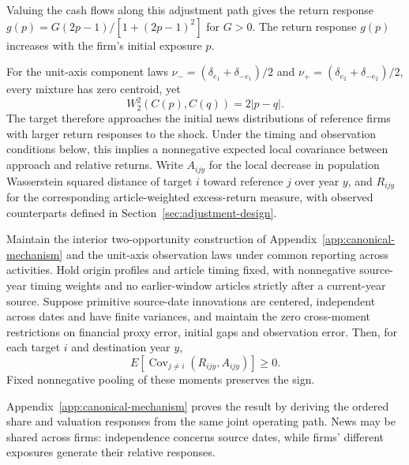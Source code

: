 Valuing the cash flows along this adjustment path gives the return response
$g(p)=G(2p-1)/[1+(2p-1)^2]$ for $G>0$.
The return response $g(p)$ increases with the firm's initial exposure $p$.

For the unit-axis component laws
$\nu_-=(\delta_{e_1}+\delta_{-e_1})/2$ and
$\nu_+=(\delta_{e_2}+\delta_{-e_2})/2$, every mixture has zero centroid, yet
\begin{equation}\label{eq:axis-observation}
  W_2^2(C(p),C(q))=2|p-q|.
\end{equation}
The target therefore approaches the initial news distributions of reference
firms with larger return responses to the shock.
Under the timing and observation conditions below, this implies a nonnegative
expected local covariance between approach and relative returns.
Write $A_{ijy}$ for the local decrease in population Wasserstein squared
distance of target $i$ toward
reference $j$ over year $y$, and $R_{ijy}$ for the corresponding article-weighted
excess-return measure, with observed counterparts defined in
Section~\ref{sec:adjustment-design}.

\begin{proposition}\label{prop:directional-alignment}
  Maintain the interior two-opportunity construction of
  Appendix~\ref{app:canonical-mechanism} and the unit-axis observation laws
  under common reporting across activities.
  Hold origin profiles and article timing fixed, with nonnegative source-year
  timing weights and no earlier-window articles strictly after a current-year
  source.
  Suppose primitive source-date innovations are centered, independent across
  dates and have finite variances, and maintain the zero cross-moment
  restrictions on financial proxy error, initial gaps and observation error.
  Then, for each target $i$ and destination year $y$,
  \[
    E[\operatorname{Cov}_{j\ne i}(R_{ijy},A_{ijy})]\geq0.
  \]
  Fixed nonnegative pooling of these moments preserves the sign.
\end{proposition}

Appendix~\ref{app:canonical-mechanism} proves the result by deriving the
ordered share and valuation responses from the same joint operating path.
News may be shared across firms: independence concerns source dates, while
firms' different exposures generate their relative responses.
